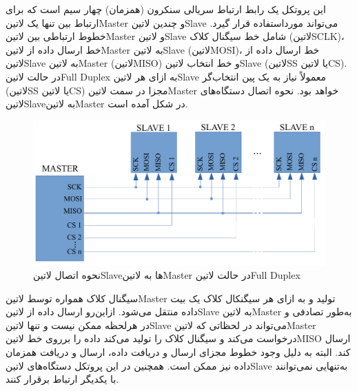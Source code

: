 
این پروتکل یک رابط ارتباط سریالی سنکرون (همزمان) چهار سیم است که برای ارتباط بین تنها یک ‌لاتین{Master} و چندین ‌لاتین{Slave} می‌تواند مورداستفاده قرار گیرد. خطوط ارتباطی بین ‌لاتین{Master} و ‌لاتین{Slave} شامل خط سیگنال کلاک (‌لاتین{SCLK})، خط ارسال داده از ‌لاتین{Master} به ‌لاتین{Slave} (‌لاتین{MOSI})، خط ارسال داده از ‌لاتین{Slave} به ‌لاتین{Master} (‌لاتین{MISO}) و خط انتخاب ‌لاتین{Slave} (‌لاتین{SS} یا ‌لاتین{CS}). در حالت ‌لاتین{Full Duplex} به ازای هر ‌لاتین{Slave} معمولاً نیاز به یک پین انتخاب‌گر (‌لاتین{SS} یا ‌لاتین{CS}) مجزا در سمت ‌لاتین{Master} خواهد بود. نحوه اتصال دستگاه‌های ‌لاتین{Slave}به ‌لاتین{Master} در شکل  آمده است. 

\begin{figure}[!h]
	\centering
	\includegraphics[width=.7\linewidth]{Assets/SPI.pdf}
	\caption{نحوه اتصال ‌لاتین{Slave}ها به ‌لاتین{Master} در حالت ‌لاتین{Full Duplex} }
	\label{fig:SPIWiring}
\end{figure}

سیگنال کلاک همواره توسط ‌لاتین{Master} تولید و به ازای هر سیگنکال کلاک یک بیت داده منتقل می‌شود. ازاین‌رو ارسال داده از ‌لاتین{Slave} به ‌لاتین{Master} به‌طور تصادفی و در هرلحظه ممکن نیست و تنها ‌لاتین{Slave} می‌تواند در لحظاتی که ‌لاتین{Master} درخواست می‌کند و سیگنال کلاک را تولید می‌کند داده را برروی خط ‌لاتین{MISO} ارسال کند. البته به دلیل وجود خطوط مجزای ارسال و دریافت داده، ارسال و دریافت همزمان داده نیز ممکن است. همچنین در این پروتکل دستگاه‌های ‌لاتین{Slave} به‌تنهایی نمی‌توانند با یکدیگر ارتباط برقرار کنند.

